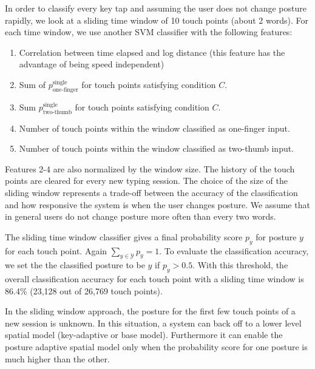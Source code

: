 \documentclass{sigchi}
\begin{document}
In order to classify every key tap and assuming the user does not change posture 
rapidly, we look at a sliding time window of 10 touch points (about 2 words). For 
each time window, we use another SVM classifier with the following features:
\begin{enumerate}
\item Correlation between time elapsed and log distance (this feature has the
advantage of being speed independent)
\item Sum of $p_\text{one-finger}^{\text{single}}$ for touch points satisfying condition $C$.
\item Sum $p_\text{two-thumb}^{\text{single}}$ for touch points satisfying condition $C$.
\item Number of touch points within the window classified as one-finger input.
\item Number of touch points within the window classified as two-thumb input.
\end{enumerate}
Features 2-4 are also normalized by the window size. The history of the touch points are cleared for every new typing session.
The choice of the size of the sliding window represents a trade-off between the 
accuracy of the classification and how responsive the system is when the user
changes posture. We assume that in general users do not change posture
more often than every two words. 

The sliding time window classifier gives a final probability score $p_y$ for posture
$y$ for each touch point. Again $\displaystyle\sum_{y\in \mathcal{Y}}p_y = 1$. To evaluate the classification accuracy, we set the the
classified posture to be $y$ if $p_y > 0.5$. With this threshold, the overall classification 
accuracy for each touch point with a sliding time window
is 86.4\% (23,128 out of 26,769 touch points).

In the sliding window approach, the posture for the first few touch points  
of a new session is unknown. In this situation, a system can back off to a lower level spatial 
model (key-adaptive or base model). Furthermore it can enable the posture 
adaptive spatial model only when the probability score for one posture is much 
higher than the other.

\end{document}
